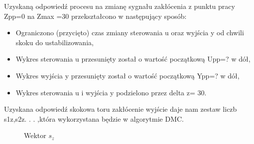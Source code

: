 Uzyskaną odpowiedź procesu na zmianę sygnału zakłócenia z punktu pracy Zpp=0 na
Zmax =30 przekształcono w następujący sposób: 
\begin{itemize}
\item Ograniczono (przycięto) czas zmiany sterowania u oraz wyjścia y od chwili skoku do ustabilizowania, 
\item Wykres sterowania u przesunięty został o wartość początkową Upp=? w dół, 
\item Wykres wyjścia y przesunięty został o wartość początkową Ypp=? w dół, 
\item Wykres sterowania u i wyjścia y podzielono przez delta z= 30.
\end{itemize}


Uzyskana odpowiedź skokowa toru zakłócenie wyjście daje nam zestaw liczb s1z,s2z. . .
,która wykorzystana będzie w algorytmie DMC.

\begin{figure}[H] 
    \centering
    
    \caption{Wektor $s_{z}$}
    \label{projekt:zad3:sz:figure}
\end{figure}
